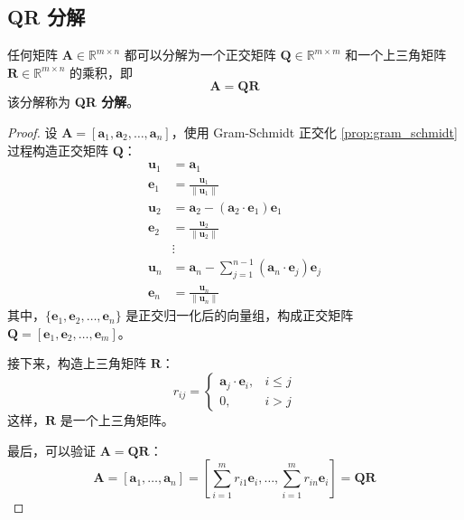 \subsection{QR 分解}
\begin{proposition}[QR 分解]
    任何矩阵 $\mathbf{A} \in \mathbb{R}^{m \times n}$ 都可以分解为一个正交矩阵 $\mathbf{Q} \in \mathbb{R}^{m \times m}$ 和一个上三角矩阵 $\mathbf{R} \in \mathbb{R}^{m \times n}$ 的乘积，即
    \[
        \mathbf{A} = \mathbf{Q} \mathbf{R}
    \]
    该分解称为 \textbf{QR 分解}。
\end{proposition}

\begin{proof}
    设 $\mathbf{A} = [\mathbf{a}_1, \mathbf{a}_2, \ldots, \mathbf{a}_n]$，使用 Gram-Schmidt 正交化 \ref{prop:gram_schmidt} 过程构造正交矩阵 $\mathbf{Q}$：
    \begin{align*}
        \mathbf{u}_1 &= \mathbf{a}_1 \\
        \mathbf{e}_1 &= \frac{\mathbf{u}_1}{\|\mathbf{u}_1\|} \\
        \mathbf{u}_2 &= \mathbf{a}_2 - (\mathbf{a}_2 \cdot \mathbf{e}_1) \mathbf{e}_1 \\
        \mathbf{e}_2 &= \frac{\mathbf{u}_2}{\|\mathbf{u}_2\|} \\
        &\vdots \\
        \mathbf{u}_n &= \mathbf{a}_n - \sum_{j=1}^{n-1} (\mathbf{a}_n \cdot \mathbf{e}_j) \mathbf{e}_j \\
        \mathbf{e}_n &= \frac{\mathbf{u}_n}{\|\mathbf{u}_n\|}
    \end{align*}
    其中，$\{\mathbf{e}_1, \mathbf{e}_2, \ldots, \mathbf{e}_n\}$ 是正交归一化后的向量组，构成正交矩阵 $\mathbf{Q} = [\mathbf{e}_1, \mathbf{e}_2, \ldots, \mathbf{e}_m]$。
    
    接下来，构造上三角矩阵 $\mathbf{R}$：
    \[
        r_{ij} = 
        \begin{cases}
            \mathbf{a}_j \cdot \mathbf{e}_i, & i \leq j \\ 
            0, & i > j 
        \end{cases}
    \]
    这样，$\mathbf{R}$ 是一个上三角矩阵。
    
    最后，可以验证 $\mathbf{A} = \mathbf{Q} \mathbf{R}$：
    \[
        \mathbf{A} = [\mathbf{a}_1, \ldots, \mathbf{a}_n] = [\sum_{i=1}^{m} r_{i1} \mathbf{e}_i, \ldots, \sum_{i=1}^{m} r_{in} \mathbf{e}_i] = \mathbf{Q} \mathbf{R}
    \]
\end{proof}

\vspace{1em}

